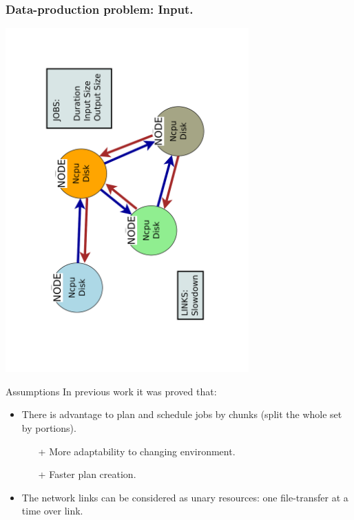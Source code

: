 \documentclass{beamer}
\begin{document}
\begin{frame}\frametitle{Data-production problem: Input.}
\vspace{-1cm}
\begin{center}
 	\includegraphics[trim= 30mm 0mm 10mm 0mm,clip,angle =-90, width=0.7\textwidth]{pic/network.pdf}
\end{center}
\vspace{-12mm}
\begin{block}{Assumptions}
In previous work \cite{Zerola} it was proved that:
		\begin{itemize}
			\item There is advantage to plan and schedule jobs by chunks (split the whole set by portions). 
					\begin{itemize}
					\item[+]More adaptability to changing environment.
					\item[+]Faster plan creation.
					\end{itemize}				
			\item The network links can be considered as unary resources: one file-transfer at a time over link.
		\end{itemize}
 	\end{block}
\end{frame}
\end{document}
